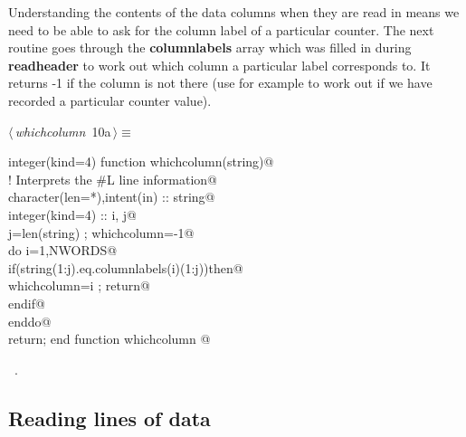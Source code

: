 \documentclass[10pt,a4paper,notitlepage]{article}
\newcommand{\var}[1]{\textbf{\textsf{#1}}} %
\newcommand{\code}[1]{\textbf{\textsf{#1}}} %
\begin{document}
Understanding the contents of the data columns when they are read in means we
need to be able to ask for the column label of a particular counter. 
The next routine goes through the \var{columnlabels} array which was filled 
in during \code{readheader} to work out which column a particular label 
corresponds to. 
It returns -1 if the column is not there (use for example to work out if we 
have recorded a particular counter value).

\begin{flushleft} \small
\begin{minipage}{\linewidth}\label{scrap10}\raggedright\small
{} $\langle\,${\it whichcolumn}\nobreak\ {\footnotesize {10a}}$\,\rangle\equiv$
\vspace{-1ex}
\begin{list}{}{} \item
\mbox{}\verb@      integer(kind=4) function whichcolumn(string)@\\
\mbox{}\verb@! Interprets the #L line information@\\
\mbox{}\verb@      character(len=*),intent(in) :: string@\\
\mbox{}\verb@      integer(kind=4) :: i, j@\\
\mbox{}\verb@      j=len(string) ;  whichcolumn=-1@\\
\mbox{}\verb@      do i=1,NWORDS@\\
\mbox{}\verb@        if(string(1:j).eq.columnlabels(i)(1:j))then@\\
\mbox{}\verb@          whichcolumn=i ;  return@\\
\mbox{}\verb@        endif@\\
\mbox{}\verb@      enddo@\\
\mbox{}\verb@      return; end function whichcolumn                                       @{\NWsep}
\end{list}
\vspace{-1.5ex}
\footnotesize
\begin{list}{}{\setlength{\itemsep}{-\parsep}\setlength{\itemindent}{-\leftmargin}}
\item \NWtxtMacroRefIn\ .

\item{}
\end{list}
\end{minipage}\vspace{4ex}
\end{flushleft}
\subsection{Reading lines of data}
\end{document}
